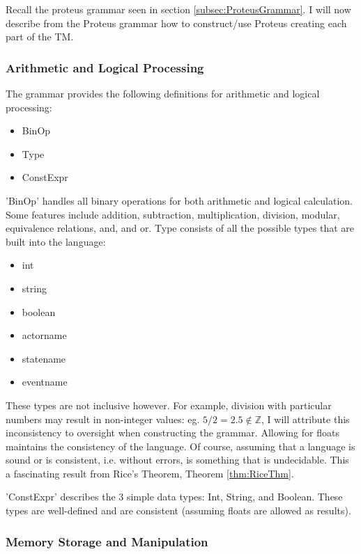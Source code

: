 Recall the proteus grammar seen in section \ref{subsec:ProteusGrammar}.
I will now describe from the Proteus grammar how to construct/use Proteus creating each part of the TM.

\subsubsection{Arithmetic and Logical Processing}\label{subsubsec:ArithLogProc}

The grammar provides the following definitions for arithmetic and logical processing:
\begin{itemize}
    \item BinOp
    \item Type
    \item ConstExpr
\end{itemize}

'BinOp' handles all binary operations for both arithmetic and logical calculation.
Some features include addition, subtraction, multiplication, division, modular, equivalence relations, and, and or.
Type consists of all the possible types that are built into the language:
\begin{itemize}
    \item int
    \item string
    \item boolean
    \item actorname
    \item statename
    \item eventname
\end{itemize}
These types are not inclusive however.
For example, division with particular numbers may result in non-integer values: eg. $5 / 2 = 2.5 \notin \mathbb{Z}$,
I will attribute this inconsistency to oversight when constructing the grammar.
Allowing for floats maintains the consistency of the language.
Of course, assuming that a language is sound or is consistent, i.e. without errors, is something that is undecidable.
This a fascinating result from Rice's Theorem, Theorem \ref{thm:RiceThm}.

'ConstExpr' describes the 3 simple data types: Int, String, and Boolean.
These types are well-defined and are consistent (assuming floats are allowed as results).

\subsubsection{Memory Storage and Manipulation}\label{subsubsec:MemStoManip}

